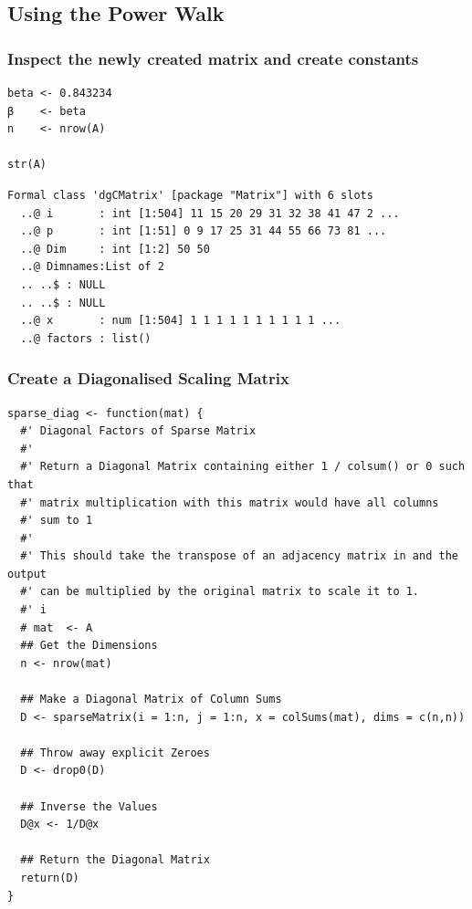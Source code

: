 \documentclass[11pt]{article}
\begin{document}
\subsection{Using the Power Walk}
\label{sec:orgad46641}
\subsubsection{Inspect the newly created matrix and create constants}
\label{sec:org257ba2f}

\lstset{language=r,label= ,caption= ,captionpos=b,numbers=none}
\begin{lstlisting}
beta <- 0.843234
β    <- beta
n    <- nrow(A)

str(A)
\end{lstlisting}

\begin{verbatim}
Formal class 'dgCMatrix' [package "Matrix"] with 6 slots
  ..@ i       : int [1:504] 11 15 20 29 31 32 38 41 47 2 ...
  ..@ p       : int [1:51] 0 9 17 25 31 44 55 66 73 81 ...
  ..@ Dim     : int [1:2] 50 50
  ..@ Dimnames:List of 2
  .. ..$ : NULL
  .. ..$ : NULL
  ..@ x       : num [1:504] 1 1 1 1 1 1 1 1 1 1 ...
  ..@ factors : list()
\end{verbatim}

\subsubsection{Create a Diagonalised Scaling Matrix}
\label{sec:org008d6ab}
\lstset{language=r,label= ,caption= ,captionpos=b,numbers=none}
\begin{lstlisting}
sparse_diag <- function(mat) {
  #' Diagonal Factors of Sparse Matrix
  #'
  #' Return a Diagonal Matrix containing either 1 / colsum() or 0 such that
  #' matrix multiplication with this matrix would have all columns
  #' sum to 1
  #'
  #' This should take the transpose of an adjacency matrix in and the output
  #' can be multiplied by the original matrix to scale it to 1.
  #' i
  # mat  <- A
  ## Get the Dimensions
  n <- nrow(mat)

  ## Make a Diagonal Matrix of Column Sums
  D <- sparseMatrix(i = 1:n, j = 1:n, x = colSums(mat), dims = c(n,n))

  ## Throw away explicit Zeroes
  D <- drop0(D)

  ## Inverse the Values
  D@x <- 1/D@x

  ## Return the Diagonal Matrix
  return(D)
}
\end{lstlisting}
\end{document}
